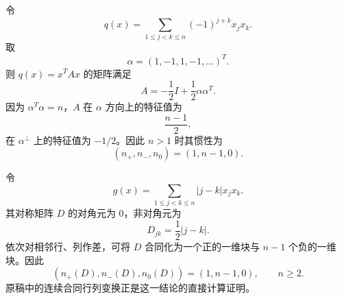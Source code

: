 \begin{example}
令
\begin{equation}
 q(x)=\sum_{1\leq j<k\leq n}(-1)^{j+k}x_jx_k.
\end{equation}
取
\begin{equation}
 \alpha=(1,-1,1,-1,\ldots)^T.
\end{equation}
则 $q(x)=x^TAx$ 的矩阵满足
\begin{equation}
 A=-\frac12I+\frac12\alpha\alpha^T.
\end{equation}
因为 $\alpha^T\alpha=n$，$A$ 在 $\alpha$ 方向上的特征值为
\begin{equation}
 \frac{n-1}{2},
\end{equation}
在 $\alpha^\perp$ 上的特征值为 $-1/2$。因此 $n>1$ 时其惯性为
\begin{equation}
 (n_+,n_-,n_0)=(1,n-1,0).
\end{equation}
\end{example}

\begin{example}
令
\begin{equation}
 g(x)=\sum_{1\leq j<k\leq n}|j-k|x_jx_k.
\end{equation}
其对称矩阵 $D$ 的对角元为 $0$，非对角元为
\begin{equation}
 D_{jk}=\frac12|j-k|.
\end{equation}
依次对相邻行、列作差，可将 $D$ 合同化为一个正的一维块与 $n-1$ 个负的一维块。因此
\begin{equation}
 (n_+(D),n_-(D),n_0(D))=(1,n-1,0),
 \qquad n\geq2.
\end{equation}
原稿中的连续合同行列变换正是这一结论的直接计算证明。
\end{example}
